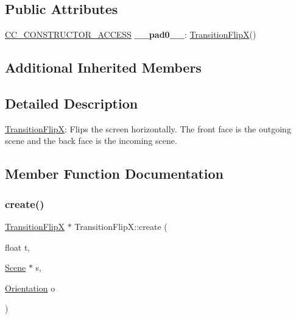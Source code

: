 \subsection*{Public Attributes}
\begin{DoxyCompactItemize}
\item 
\mbox{\label{classTransitionFlipX_a33d1971c17d3ce2d60e6a7c62875ec72}} 
\hyperlink{_2cocos2d_2cocos_2base_2ccConfig_8h_a25ef1314f97c35a2ed3d029b0ead6da0}{C\+C\+\_\+\+C\+O\+N\+S\+T\+R\+U\+C\+T\+O\+R\+\_\+\+A\+C\+C\+E\+SS} {\bfseries \+\_\+\+\_\+pad0\+\_\+\+\_\+}\+: \hyperlink{classTransitionFlipX}{Transition\+FlipX}()
\end{DoxyCompactItemize}
\subsection*{Additional Inherited Members}


\subsection{Detailed Description}
\hyperlink{classTransitionFlipX}{Transition\+FlipX}\+: Flips the screen horizontally. The front face is the outgoing scene and the back face is the incoming scene. 

\subsection{Member Function Documentation}
\mbox{\label{classTransitionFlipX_a8de7e7710196b3694822d713170d1c50}} 
\subsubsection{\texorpdfstring{create()}{create()}\hspace{0.1cm}{\footnotesize\ttfamily [1/4]}}
{\footnotesize\ttfamily \hyperlink{classTransitionFlipX}{Transition\+FlipX} $\ast$ Transition\+Flip\+X\+::create (\begin{DoxyParamCaption}\item[{float}]{t,  }\item[{\hyperlink{classScene}{Scene} $\ast$}]{s,  }\item[{\hyperlink{classTransitionScene_a0b2b247806fb10a20de0cbc554210c4d}{Orientation}}]{o }\end{DoxyParamCaption})\hspace{0.3cm}{\ttfamily [static]}}

